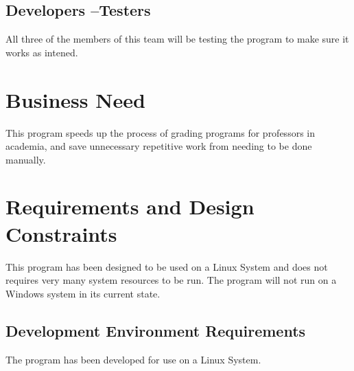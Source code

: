 \subsection{Developers --Testers}
All three of the members of this team will be testing the program to make sure it works as intened.



\section{Business Need}
This program speeds up the process of grading programs for professors in academia, and save unnecessary repetitive work from needing to be done manually. 


\section{Requirements and Design Constraints}
This program has been designed to be used on a Linux System and does not requires very many system resources to be run. The program will not run on a Windows system in its current state.






\subsection{Development Environment Requirements}
The program has been developed for use on a Linux System.


